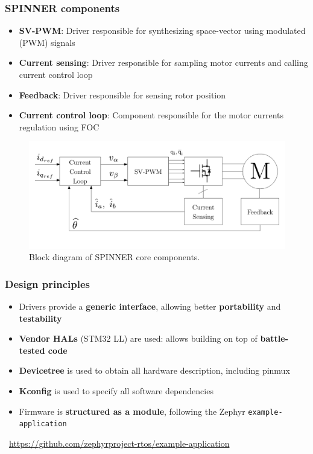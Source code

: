 \documentclass[handout]{beamer}
\begin{document}
\begin{frame}
  \frametitle{SPINNER components}

  \begin{itemize}
    \item<1-> \textbf{SV-PWM}: Driver responsible for synthesizing space-vector
          using modulated (PWM) signals
    \item<2-> \textbf{Current sensing}: Driver responsible for sampling motor
          currents and calling current control loop
    \item<3-> \textbf{Feedback}: Driver responsible for sensing rotor position
    \item<4-> \textbf{Current control loop}: Component responsible for the motor
          currents regulation using FOC
  \end{itemize}

  \begin{figure}
    \centering
    \includegraphics[scale=0.35]{spinner-schematic.pdf}
    \caption{Block diagram of SPINNER core components.}
  \end{figure}
\end{frame}

\begin{frame}
  \frametitle{Design principles}

  \begin{itemize}
    \item<1-> Drivers provide a \textbf{generic interface}, allowing better
          \textbf{portability} and \textbf{testability}
    \item<2-> \textbf{Vendor HALs} (STM32 LL) are used: allows building on top
          of \textbf{battle-tested code}
    \item<3-> \textbf{Devicetree} is used to obtain all hardware description,
          including pinmux
    \item<4-> \textbf{Kconfig} is used to specify all software dependencies
    \item<5-> Firmware is \textbf{structured as a module}, following the Zephyr
          \texttt{example-application}
  \end{itemize}

  \vspace{1em}

  \begin{center}
    \scriptsize
    \faGlobeAmericas~\url{https://github.com/zephyrproject-rtos/example-application}
  \end{center}
\end{frame}
\end{document}

